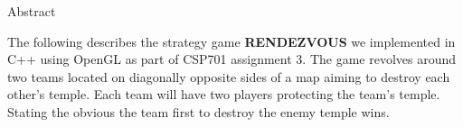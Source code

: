 \begin{center}
\LARGE{Abstract}
\end{center}

\vspace{0.5in}

The following describes the strategy game \textbf {RENDEZVOUS} we implemented in C++ using OpenGL as part of CSP701 assignment 3. The game revolves around two teams located on diagonally opposite sides of a map aiming to destroy each other’s temple. Each team will have two players protecting the team’s temple. Stating the obvious the team first to destroy the enemy temple wins.
